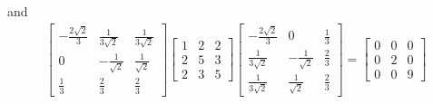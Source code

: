 \begin{Answer}
\begin{enumerate}[label=(\alph*)]
and
\begin{align*}
\begin{bmatrix}
-\frac{2\sqrt{2}}{3}&\frac{1}{3\sqrt{2}}&\frac{1}{3\sqrt{2}}\\ 
0&-\frac{1}{\sqrt{2}}&\frac{1}{\sqrt{2}}\\ 
\frac{1}{3}&\frac{2}{3}&\frac{2}{3}
\end{bmatrix}
\begin{bmatrix}
1 & 2 & 2\\
2 & 5 & 3\\
2 & 3 & 5
\end{bmatrix}
\begin{bmatrix}
-\frac{2\sqrt{2}}{3}&0&\frac{1}{3}\\ 
\frac{1}{3\sqrt{2}}&-\frac{1}{\sqrt{2}}&\frac{2}{3}\\ 
\frac{1}{3\sqrt{2}}&\frac{1}{\sqrt{2}}&\frac{2}{3}
\end{bmatrix}
=
\begin{bmatrix}
0 & 0 & 0 \\
0 & 2 & 0 \\
0 & 0 & 9
\end{bmatrix}
\end{align*}
\end{enumerate}
\end{Answer}

